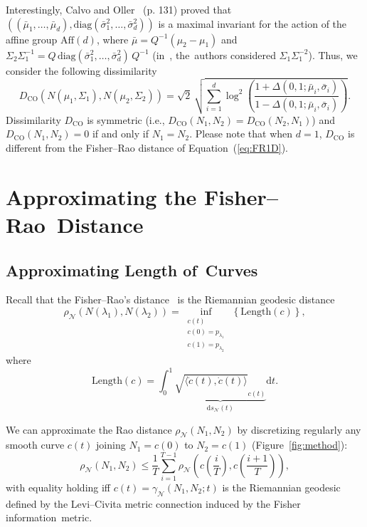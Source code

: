 \documentclass[entropy,article,accept,oneauthor,pdftex,entropy]{Definitions/mdpi}
\def\CO{\mathrm{CO}}
\def\diag{\mathrm{diag}}
\def\Aff{\mathrm{Aff}}
\def\inner#1#2{{\langle #1, #2\rangle}}
\def\calN{\mathcal{N}}
\def\Length{\mathrm{Length}}
\def\dt{\mathrm{d}t}
\def\Aff{\mathrm{Aff}}
\def\ds{\mathrm{d}s}
\begin{document}
Interestingly, Calvo and Oller~\cite{calvo1991explicit} (p. 131) proved that $((\bar\mu_1,\ldots,\bar\mu_d),\diag(\bar\sigma_1^2,\ldots,\bar\sigma_d^2))$
 is a maximal invariant for the action of the affine group $\Aff(d)$, where $\bar\mu=Q^{-1}(\mu_2-\mu_1)$ and 
$\Sigma_2\Sigma_1^{-1}=Q\,\diag(\bar\sigma_1^2,\ldots,\bar\sigma_d^2)\, Q^{-1}$ (in~\cite{calvo1991explicit}, the~authors considered 
$\Sigma_1\Sigma_1^{-2}$).
Thus, we consider the following dissimilarity
\begin{equation}\label{eq:DCO}
D_\CO(N(\mu_1,\Sigma_1),N(\mu_2,\Sigma_2))=\sqrt{2}\, \sqrt{\sum_{i=1}^d \log^2\left(\frac{1+\Delta(0,1;\bar\mu_i,\bar\sigma_i)}{1-\Delta(0,1;\bar\mu_i,\bar\sigma_i)} \right)}.
\end{equation}
Dissimilarity $D_\CO$ is symmetric (i.e., $D_\CO(N_1,N_2)=D_\CO(N_2,N_1)$) and $D_\CO(N_1,N_2)=0$ if and only if $N_1=N_2$.
Please note that when $d=1$, $D_\CO$ is different from the Fisher--Rao distance of Equation~(\ref{eq:FR1D}).


\section{Approximating the Fisher--Rao~Distance}\label{sec:approxFR}

\subsection{Approximating Length of~Curves}\label{sec:approxlength}

Recall that the Fisher--Rao's distance~\cite{micchelli2005rao} is the Riemannian geodesic distance
$$
\rho_\calN(N(\lambda_1),N(\lambda_2))=\inf_{\substack{c(t)\\ c(0)=p_{\lambda_1}\\ c(1)=p_{\lambda_2}}}  \, \left\{\Length(c)\right\},
$$
\noindent where 
$$
\Length(c)=\int_0^1 \underbrace{\sqrt{\inner{\dot c(t)}{\dot c(t)}}_{c(t)}}_{\ds_\calN(t)} \dt.
$$



We can approximate the Rao distance $\rho_\calN(N_1,N_2)$ by discretizing regularly  any smooth curve $c(t)$ joining 
$N_1=c(0)$ to $N_2=c(1)$ (Figure~\ref{fig:method}):
$$
\rho_\calN(N_1,N_2)\leq \frac{1}{T} \sum_{i=1}^{T-1} \rho_\calN\left(c\left(\frac{i}{T}\right),c\left(\frac{i+1}{T}\right)\right),$$
with equality holding iff $c(t)=\gamma_\calN(N_1,N_2;t)$ is the Riemannian geodesic defined by the Levi–Civita metric connection induced by the Fisher information~metric.
\end{document}
